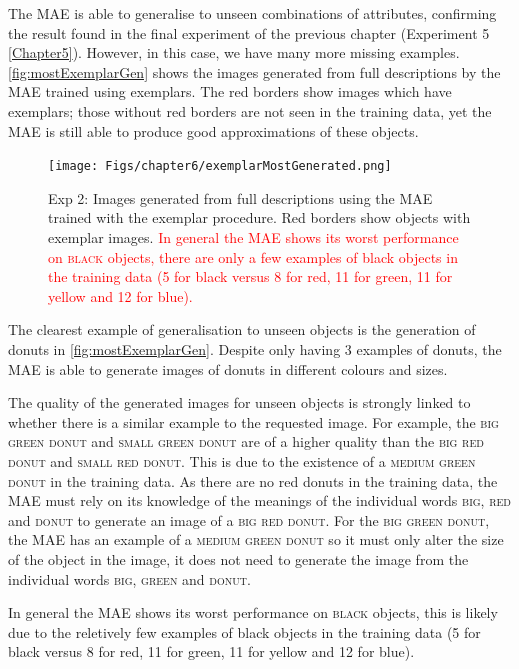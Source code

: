 The \ac{MAE} is able to generalise to unseen combinations of attributes, confirming the result found in the final experiment of the previous chapter (Experiment 5 \autoref{Chapter5}). However, in this case, we have many more missing examples. \autoref{fig:mostExemplarGen} shows the images generated from full descriptions by the \ac{MAE} trained using exemplars. The red borders show images which have exemplars; those without red borders are not seen in the training data, yet the \ac{MAE} is still able to produce good approximations of these objects.

\begin{figure}[ht]
    \centering
    \texttt{[image: Figs/chapter6/exemplarMostGenerated.png]}
    \caption{Exp 2: Images generated from full descriptions using the \ac{MAE} trained with the exemplar procedure. Red borders show objects with exemplar images. \textcolor{red}{In general the \ac{MAE} shows its worst performance on \textsc{black} objects, there are only a few examples of black objects in the training data (5 for black versus 8 for red, 11 for green, 11 for yellow and 12 for blue).}}
    \label{fig:mostExemplarGen}
\end{figure}

The clearest example of generalisation to unseen objects is the generation of donuts in \autoref{fig:mostExemplarGen}. Despite only having 3 examples of donuts, the \ac{MAE} is able to generate images of donuts in different colours and sizes.  

The quality of the generated images for unseen objects is strongly linked to whether there is a similar example to the requested image. For example, the \textsc{big green donut} and \textsc{small green donut} are of a higher quality than the \textsc{big red donut} and \textsc{small red donut}. This is due to the existence of a \textsc{medium green donut} in the training data. As there are no red donuts in the training data, the \ac{MAE} must rely on its knowledge of the meanings of the individual words \textsc{big}, \textsc{red} and \textsc{donut} to generate an image of a \textsc{big red donut}. For the \textsc{big green donut}, the \ac{MAE} has an example of a \textsc{medium green donut} so it must only alter the size of the object in the image, it does not need to generate the image from the individual words \textsc{big}, \textsc{green} and \textsc{donut}.

In general the \ac{MAE} shows its worst performance on \textsc{black} objects, this is likely due to the reletively few examples of black objects in the training data (5 for black versus 8 for red, 11 for green, 11 for yellow and 12 for blue).

